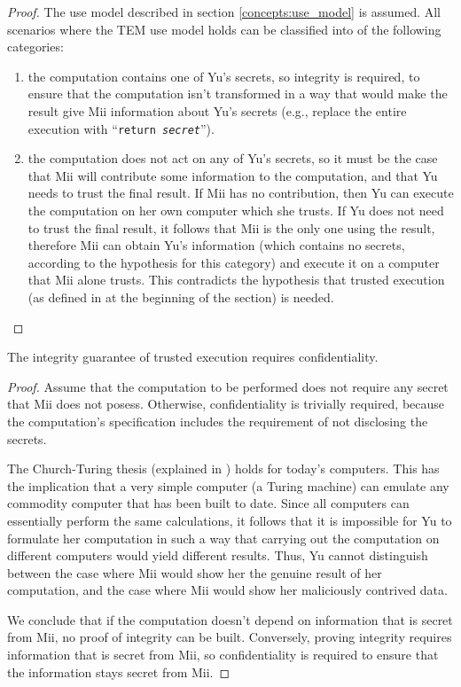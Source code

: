\begin{proof}
The use model described in section \ref{concepts:use_model} is assumed. All
scenarios where the TEM use model holds can be classified into of the following
categories:
\begin{enumerate}
  \item {the computation contains one of Yu's secrets}, so integrity is
  required, to ensure that the computation isn't transformed in a way that
  would make the result give Mii information about Yu's secrets (e.g., replace
  the entire execution with ``\texttt{return \textit{secret}}'').
  \item {the computation does not act on any of Yu's secrets}, so it must be
  the case that Mii will contribute some information to the computation, and
  that Yu needs to trust the final result. If Mii has no contribution, then
  Yu can execute the computation on her own computer which she trusts. If Yu
  does not need to trust the final result, it follows that Mii is the only one
  using the result, therefore Mii can obtain Yu's information (which contains
  no secrets, according to the hypothesis for this category) and execute it on a
  computer that Mii alone trusts. This contradicts the hypothesis that trusted
  execution (as defined in at the beginning of the section) is needed.
\end{enumerate}
\end{proof}

\begin{theorem*}
The integrity guarantee of trusted execution requires confidentiality.   
\end{theorem*}

\begin{proof}
Assume that the computation to be performed does not require any secret that
Mii does not posess. Otherwise, confidentiality is trivially required, because
the computation's specification includes the requirement of not disclosing the
secrets.

The Church-Turing thesis (explained in \cite{kleene1952im}) holds for today's
computers. This has the implication that a very simple computer (a Turing
machine) can emulate any commodity computer that has been built to date. Since
all computers can essentially perform the same calculations, it follows that it
is impossible for Yu to formulate her computation in such a way that carrying
out the computation on different computers would yield different results. Thus,
Yu cannot distinguish between the case where Mii would show her the
genuine result of her computation, and the case where Mii would show her
maliciously contrived data.

We conclude that if the computation doesn't depend on information that is
secret from Mii, no proof of integrity can be built. Conversely, proving
integrity requires information that is secret from Mii, so confidentiality is
required to ensure that the information stays secret from Mii.
\end{proof}

